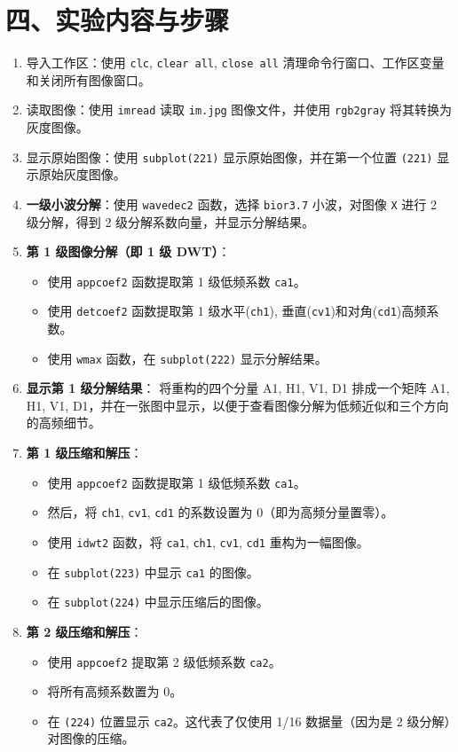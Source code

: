 \documentclass[12pt, a4paper]{article}
\begin{document}
\section*{\centering 四、实验内容与步骤}
\begin{enumerate}
    \item 导入工作区：使用 \texttt{clc}, \texttt{clear all}, \texttt{close all} 清理命令行窗口、工作区变量和关闭所有图像窗口。
    \item 读取图像：使用 \texttt{imread} 读取 \texttt{im.jpg} 图像文件，并使用 \texttt{rgb2gray} 将其转换为灰度图像。
    \item 显示原始图像：使用 \texttt{subplot(221)} 显示原始图像，并在第一个位置 \texttt{(221)} 显示原始灰度图像。
    \item \textbf{一级小波分解}：使用 \texttt{wavedec2} 函数，选择 \texttt{bior3.7} 小波，对图像 \texttt{X} 进行 2 级分解，得到 2 级分解系数向量，并显示分解结果。
    \item \textbf{第 1 级图像分解（即 1 级 DWT）}：
    \begin{itemize}
        \item 使用 \texttt{appcoef2} 函数提取第 1 级低频系数 \texttt{ca1}。
        \item 使用 \texttt{detcoef2} 函数提取第 1 级水平(\texttt{ch1}), 垂直(\texttt{cv1})和对角(\texttt{cd1})高频系数。
        \item 使用 \texttt{wmax} 函数，在 \texttt{subplot(222)} 显示分解结果。
    \end{itemize}
    \item \textbf{显示第 1 级分解结果}： 将重构的四个分量 A1, H1, V1, D1 排成一个矩阵 A1, H1, V1, D1，并在一张图中显示，以便于查看图像分解为低频近似和三个方向的高频细节。
    \item \textbf{第 1 级压缩和解压}：
    \begin{itemize}
        \item 使用 \texttt{appcoef2} 函数提取第 1 级低频系数 \texttt{ca1}。
        \item 然后，将 \texttt{ch1}, \texttt{cv1}, \texttt{cd1} 的系数设置为 0（即为高频分量置零）。
        \item 使用 \texttt{idwt2} 函数，将 \texttt{ca1}, \texttt{ch1}, \texttt{cv1}, \texttt{cd1} 重构为一幅图像。
        \item 在 \texttt{subplot(223)} 中显示 \texttt{ca1} 的图像。
        \item 在 \texttt{subplot(224)} 中显示压缩后的图像。
    \end{itemize}
    \item \textbf{第 2 级压缩和解压}：
    \begin{itemize}
        \item 使用 \texttt{appcoef2} 提取第 2 级低频系数 \texttt{ca2}。
        \item 将所有高频系数置为 0。
        \item 在 \texttt{(224)} 位置显示 \texttt{ca2}。这代表了仅使用 1/16 数据量（因为是 2 级分解）对图像的压缩。
    \end{itemize}
\end{enumerate}
\end{document}
